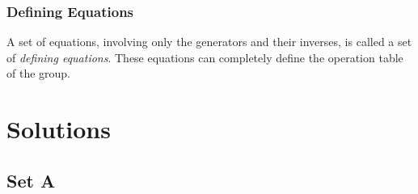 \documentclass[12pt]{article}
\begin{document}
\subsubsection*{Defining Equations}
A set of equations, involving only the generators and their inverses, is called a set of \textit{defining equations}. These equations can completely define the operation table of the group.


\section*{Solutions}
\label{sec:solutions}

\subsection*{Set A}
\end{document}
